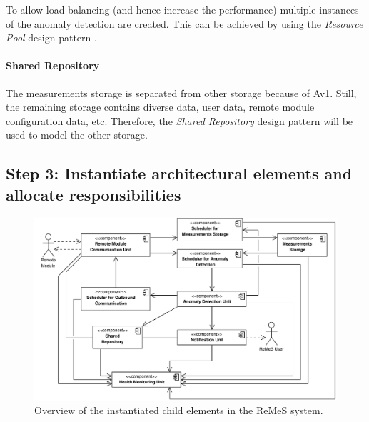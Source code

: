 \npar To allow load balancing (and hence increase the performance) multiple
instances of the anomaly detection are created. This can be achieved by using
the \emph{Resource Pool} design pattern \citep[see][p.~503]{Buschmann:07}. 

\paragraph{Shared Repository}

\npar The measurements storage is separated from other storage because of Av1.
Still, the remaining storage contains diverse data, user data, remote module
configuration data, etc. Therefore, the \emph{Shared Repository} design pattern
\citep[see][p.~202]{Buschmann:07} will be used to model the other storage.

\subsection{Step 3: Instantiate architectural elements and allocate responsibilities}
\label{add:it1/elements}

\begin{figure}[H]
	\begin{centering}
		\includegraphics[height=\textwidth,angle=90]{figs/add-it1-elements.pdf}
		\caption{Overview of the instantiated child elements in the ReMeS system.}
		\label{fig:it1/elements}
	\end{centering}
\end{figure}

